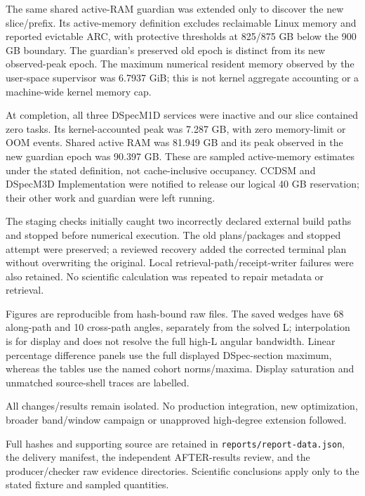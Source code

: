 \documentclass[11pt,a4paper]{article}
\begin{document}
The same shared active-RAM guardian was extended only to discover the new slice/prefix. Its active-memory definition excludes reclaimable Linux memory and reported evictable ARC, with protective thresholds at 825/875 GB below the 900 GB boundary. The guardian's preserved old epoch is distinct from its new observed-peak epoch. The maximum numerical resident memory observed by the user-space supervisor was 6.7937 GiB; this is not kernel aggregate accounting or a machine-wide kernel memory cap.

At completion, all three DSpecM1D services were inactive and our slice contained zero tasks. Its kernel-accounted peak was 7.287 GB, with zero memory-limit or OOM events. Shared active RAM was 81.949 GB and its peak observed in the new guardian epoch was 90.397 GB. These are sampled active-memory estimates under the stated definition, not cache-inclusive occupancy. CCDSM and DSpecM3D Implementation were notified to release our logical 40 GB reservation; their other work and guardian were left running.

The staging checks initially caught two incorrectly declared external build paths and stopped before numerical execution. The old plans/packages and stopped attempt were preserved; a reviewed recovery added the corrected terminal plan without overwriting the original. Local retrieval-path/receipt-writer failures were also retained. No scientific calculation was repeated to repair metadata or retrieval.

Figures are reproducible from hash-bound raw files. The saved wedges have 68 along-path and 10 cross-path angles, separately from the solved L; interpolation is for display and does not resolve the full high-L angular bandwidth. Linear percentage difference panels use the full displayed DSpec-section maximum, whereas the tables use the named cohort norms/maxima. Display saturation and unmatched source-shell traces are labelled.

All changes/results remain isolated. No production integration, new optimization, broader band/window campaign or unapproved high-degree extension followed.

\medskip\noindent\small Full hashes and supporting source are retained in \texttt{reports/report-data.json}, the delivery manifest, the independent AFTER-results review, and the producer/checker raw evidence directories. Scientific conclusions apply only to the stated fixture and sampled quantities.
\end{document}
